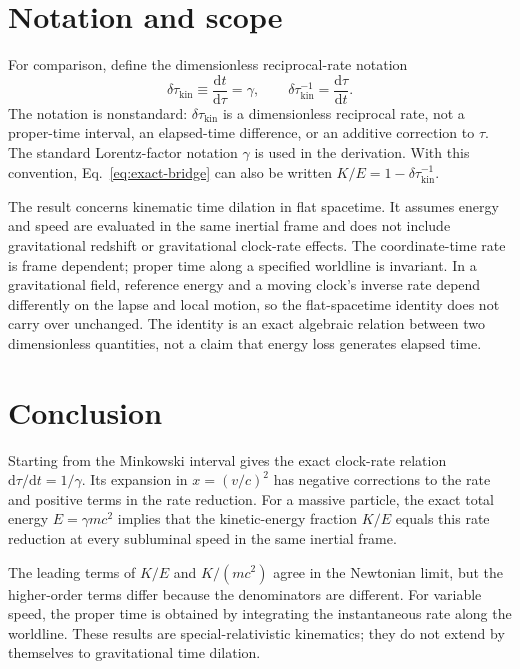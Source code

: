 \documentclass[12pt]{article}
\begin{document}
\section{Notation and scope}

For comparison, define the dimensionless reciprocal-rate notation
\begin{equation}
  \delta\tau_{\mathrm{kin}}\equiv\frac{\mathrm{d}t}{\mathrm{d}\tau}=\gamma,
  \qquad
  \delta\tau_{\mathrm{kin}}^{-1}
  =\frac{\mathrm{d}\tau}{\mathrm{d}t}.
  \label{eq:lmp-convention}
\end{equation}
The notation is nonstandard: $\delta\tau_{\mathrm{kin}}$ is a dimensionless reciprocal rate, not a proper-time interval, an elapsed-time difference, or an additive correction to $\tau$. The standard Lorentz-factor notation $\gamma$ is used in the derivation. With this convention, Eq.~\eqref{eq:exact-bridge} can also be written $K/E=1-\delta\tau_{\mathrm{kin}}^{-1}$.

The result concerns kinematic time dilation in flat spacetime. It assumes energy and speed are evaluated in the same inertial frame and does not include gravitational redshift or gravitational clock-rate effects. The coordinate-time rate is frame dependent; proper time along a specified worldline is invariant. In a gravitational field, reference energy and a moving clock's inverse rate depend differently on the lapse and local motion, so the flat-spacetime identity does not carry over unchanged. The identity is an exact algebraic relation between two dimensionless quantities, not a claim that energy loss generates elapsed time.

\section{Conclusion}

Starting from the Minkowski interval gives the exact clock-rate relation $\mathrm{d}\tau/\mathrm{d}t=1/\gamma$. Its expansion in $x=(v/c)^2$ has negative corrections to the rate and positive terms in the rate reduction. For a massive particle, the exact total energy $E=\gamma mc^2$ implies that the kinetic-energy fraction $K/E$ equals this rate reduction at every subluminal speed in the same inertial frame.

The leading terms of $K/E$ and $K/(mc^2)$ agree in the Newtonian limit, but the higher-order terms differ because the denominators are different. For variable speed, the proper time is obtained by integrating the instantaneous rate along the worldline. These results are special-relativistic kinematics; they do not extend by themselves to gravitational time dilation.
\end{document}
